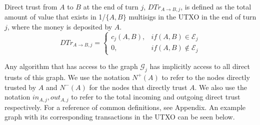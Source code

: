 \documentclass[11pt]{llncs}
\theoremstyle{definition}
\begin{document}
     \begin{definition}
        Direct trust from $A$ to $B$ at the end of turn $j$, $DTr_{A \rightarrow B, j}$, is defined as the total amount of
        value that exists in 1/$\{A,B\}$ multisigs in the UTXO in the end of turn $j$, where the money is deposited by $A$.
        \begin{equation}
           DTr_{A \rightarrow B, j} =
              \begin{cases}
                 c_j\left(A, B\right), & if \left(A, B\right) \in \mathcal{E}_j \\
                 0, & if \left(A, B\right) \notin \mathcal{E}_j
              \end{cases}
        \end{equation}
     \end{definition}
     Any algorithm that has access to the graph $\mathcal{G}_j$ has implicitly access to all direct trusts of this graph.
     We use the notation $N^{+}(A)$ to refer to the nodes directly trusted by $A$ and $N^{-}(A)$ for the nodes that directly
     trust $A$. We also use the notation $in_{A, j}, out_{A, j}$ to refer to the total incoming and outgoing direct trust
     respectively. For a reference of common definitions, see Appendix. An example graph with its corresponding transactions
     in the UTXO can be seen below.
\end{document}
